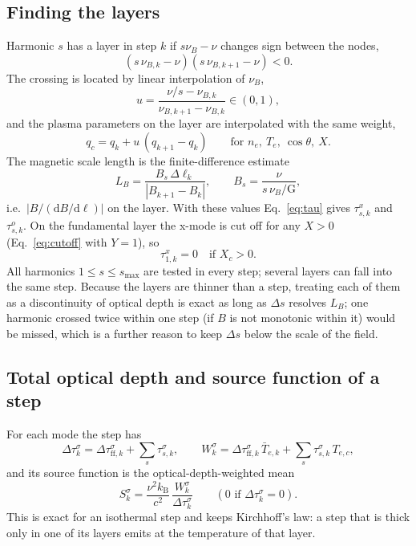 \documentclass[11pt,a4paper]{article}
\newcommand{\dd}{\mathrm{d}}
\newcommand{\kB}{k_\mathrm{B}}
\newcommand{\nuB}{\nu_B}
\begin{document}
\subsection{Finding the layers}
Harmonic $s$ has a layer in step $k$ if $s\nuB-\nu$ changes sign between the nodes,
\begin{equation}
  \left(s\,\nu_{B,k}-\nu\right)\left(s\,\nu_{B,k+1}-\nu\right)<0 .
\end{equation}
The crossing is located by linear interpolation of $\nuB$,
\begin{equation}
  u=\frac{\nu/s-\nu_{B,k}}{\nu_{B,k+1}-\nu_{B,k}}\in(0,1),
\end{equation}
and the plasma parameters on the layer are interpolated with the same weight,
\begin{equation}
  q_c=q_k+u\,(q_{k+1}-q_k)\qquad\text{for } n_e,\ T_e,\ \cos\theta,\ X .
\end{equation}
The magnetic scale length is the finite-difference estimate
\begin{equation}
  L_B=\frac{B_s\,\Delta\ell_k}{|B_{k+1}-B_k|},\qquad B_s=\frac{\nu}{s\,\nuB/\text{G}},
  \label{eq:LB}
\end{equation}
i.e.\ $|B/(\dd B/\dd\ell)|$ on the layer. With these values Eq.~\eqref{eq:tau} gives
$\tau^x_{s,k}$ and $\tau^o_{s,k}$. On the fundamental layer the x-mode is cut off for any
$X>0$ (Eq.~\ref{eq:cutoff} with $Y=1$), so
\begin{equation}
  \tau^x_{1,k}=0\quad\text{if } X_c>0 .
\end{equation}
All harmonics $1\le s\le s_\text{max}$ are tested in every step; several layers can fall into
the same step. Because the layers are thinner than a step, treating each of them as a
discontinuity of optical depth is exact as long as $\Delta s$ resolves $L_B$; one harmonic
crossed twice within one step (if $B$ is not monotonic within it) would be missed, which is a
further reason to keep $\Delta s$ below the scale of the field.

\subsection{Total optical depth and source function of a step}
For each mode the step has
\begin{equation}
  \Delta\tau^\sigma_k=\Delta\tau^\sigma_{\text{ff},k}+\sum_{s}\tau^\sigma_{s,k},
  \qquad
  W^\sigma_k=\Delta\tau^\sigma_{\text{ff},k}\,\bar T_{e,k}+\sum_s\tau^\sigma_{s,k}\,T_{e,c},
\end{equation}
and its source function is the optical-depth-weighted mean
\begin{equation}
  S^\sigma_k=\frac{\nu^2\kB}{c^2}\,\frac{W^\sigma_k}{\Delta\tau^\sigma_k}
  \qquad(0\text{ if }\Delta\tau^\sigma_k=0).
  \label{eq:Seff}
\end{equation}
This is exact for an isothermal step and keeps Kirchhoff's law: a step that is thick only in
one of its layers emits at the temperature of that layer.
\end{document}
